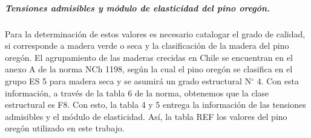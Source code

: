 \begin{table}[h]
\centering
{}
\caption{Valores de la densidad normal y anhidra del pino oregón. $^{\dagger}$: Definido con el percentil 5\% de exclusión.}
\label{tab:densidad_oregon}
\end{table}

\subparagraph{Tensiones admisibles y módulo de elasticidad del pino oregón.}
Para la determinación de estos valores es necesario catalogar el grado de calidad, si corresponde a madera verde o seca y la clasificación de la madera del pino oregón. El agrupamiento de las maderas crecidas en Chile se encuentran en el anexo A de la norma NCh 1198, según la cual el pino oregón se clasifica en el grupo ES 5 para madera seca y se asumirá un grado estructural N$^{\circ}$ 4. Con esta información, a través de la tabla 6 de la norma, obtenemos que la clase estructural es F8. Con esto, la tabla 4 y 5 entrega la información de las tensiones admisibles y el módulo de elasticidad. Así, la tabla REF los valores del pino oregón utilizado en este trabajo.

